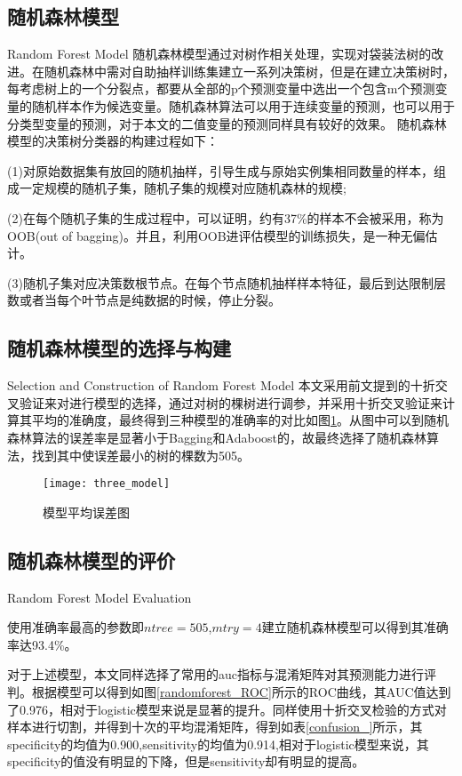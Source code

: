 \subsection{随机森林模型}{Random Forest Model}
随机森林模型通过对树作相关处理，实现对袋装法树的改进。在随机森林中需对自助抽样训练集建立一系列决策树，但是在建立决策树时，每考虑树上的一个分裂点，都要从全部的p个预测变量中选出一个包含m个预测变量的随机样本作为候选变量。随机森林算法可以用于连续变量的预测，也可以用于分类型变量的预测，对于本文的二值变量的预测同样具有较好的效果\cite{james_introduction_2013}。
随机森林模型的决策树分类器的构建过程如下：

(1)对原始数据集有放回的随机抽样，引导生成与原始实例集相同数量的样本，组成一定规模的随机子集，随机子集的规模对应随机森林的规模;

(2)在每个随机子集的生成过程中，可以证明，约有37\%的样本不会被采用，称为OOB(out of bagging)。并且，利用OOB进评估模型的训练损失，是一种无偏估计\cite{Breiman2001Random}。


(3)随机子集对应决策数根节点。在每个节点随机抽样样本特征，最后到达限制层数或者当每个叶节点是纯数据的时候，停止分裂。

\subsection{随机森林模型的选择与构建}{Selection and Construction of Random Forest Model}
本文采用前文提到的十折交叉验证来对进行模型的选择，通过对树的棵树进行调参，并采用十折交叉验证来计算其平均的准确度，最终得到三种模型的准确率的对比如图\ref{three_model}。从图中可以到随机森林算法的误差率是显著小于Bagging和Adaboost的，故最终选择了随机森林算法，找到其中使误差最小的树的棵数为505。
\begin{figure}[!ht]
    \centering
    \texttt{[image: three\_model]}
    \caption{模型平均误差图} \label{three_model}
    \end{figure}


\subsection{随机森林模型的评价}{Random Forest Model Evaluation}

使用准确率最高的参数即$ntree = 505$,$mtry = 4$建立随机森林模型可以得到其准确率达93.4\%。

对于上述模型，本文同样选择了常用的auc指标与混淆矩阵对其预测能力进行评判。根据模型可以得到如图\ref{randomforest_ROC}所示的ROC曲线，其AUC值达到了0.976，相对于logistic模型来说是显著的提升。同样使用十折交叉检验的方式对样本进行切割，并得到十次的平均混淆矩阵，得到如表\cref{confusion_}所示，其specificity的均值为0.900,sensitivity的均值为0.914,相对于logistic模型来说，其specificity的值没有明显的下降，但是sensitivity却有明显的提高。


